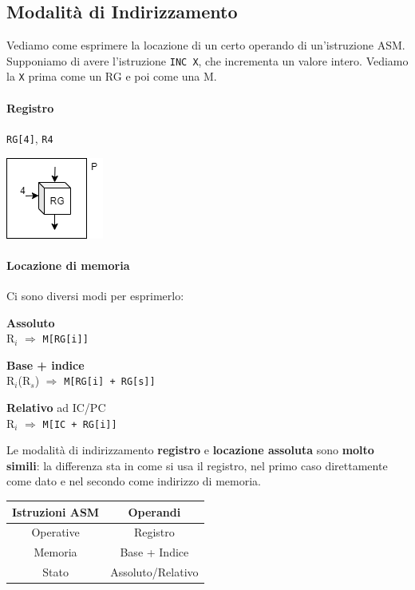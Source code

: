 \documentclass[10pt]{report}
\begin{document}
\subsection{Modalità di Indirizzamento}
Vediamo come esprimere la locazione di un certo operando di un'istruzione ASM. Supponiamo di avere l'istruzione \texttt{INC X}, che incrementa un valore intero. Vediamo la \texttt{X} prima come un RG e poi come una M.
\begin{multicols}{2}
\paragraph{Registro} \texttt{RG[4]}, \texttt{R4}
\begin{center}
\includegraphics[scale=1]{indiriz_rg.png}
\end{center}
\columnbreak
\paragraph{Locazione di memoria} Ci sono diversi modi per esprimerlo:
\begin{list}{}{}
	\item \textbf{Assoluto}\\R$_i$ $\Rightarrow$ \texttt{M[RG[i]]}
	\item \textbf{Base + indice}\\R$_i$(R$_s$) $\Rightarrow$ \texttt{M[RG[i] + RG[s]]}
	\item \textbf{Relativo} ad IC/PC\\R$_i$ $\Rightarrow$ \texttt{M[IC + RG[i]]}
\end{list}
\end{multicols}
Le modalità di indirizzamento \textbf{registro} e \textbf{locazione assoluta} sono \textbf{molto simili}: la differenza sta in come si usa il registro, nel primo caso direttamente come dato e nel secondo come indirizzo di memoria.
\begin{center}
\begin{tabular}{c | c}
\textbf{Istruzioni ASM} & \textbf{Operandi} \\
\hline
Operative & Registro \\
Memoria & Base + Indice \\
Stato & Assoluto/Relativo
\end{tabular}
\end{center}
\end{document}
